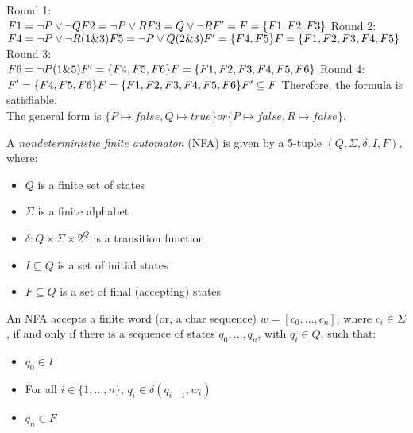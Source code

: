 \documentclass[11pt,a4paper]{article}
\begin{document}
	\begin{solution}
		Round 1:\\
		$F1 = \lnot P \lor \lnot Q \\
		F2 = \lnot P \lor R \\
		F3 = Q \lor \lnot R \\
		F' = \empty \\
		F = \{F1, F2, F3 \} \\
		$
		Round 2:\\
		$
		F4 = \lnot P \lor \lnot R (1\&3)\\
		F5 = \lnot P \lor Q (2\&3) \\
		F' = \{F4,F5\}\\
		F = \{F1,F2,F3,F4,F5\}\\
		$
		Round 3:\\
		$
		F6 = \lnot P (1\&5)\\
		F' = \{F4,F5,F6\}\\
		F = \{F1,F2,F3,F4,F5,F6\}\\
		$
		Round 4:\\
		$
		F' = \{F4,F5,F6\}\\
		F = \{F1,F2,F3,F4,F5,F6\}\\
		F' \subseteq F\\
		$
		Therefore, the formula is satisfiable.\\
		The general form is $\{P \mapsto false, Q \mapsto true\} or \{P \mapsto false, R \mapsto false\}.$
		\end{solution}
		
		\newpage
		
		A \emph{nondeterministic finite automaton} (NFA) is given by a 5-tuple $(Q, \Sigma, \delta, I, F)$, where:
		\begin{itemize}
		\item $Q$ is a finite set of states
		\item $\Sigma$ is a finite alphabet
		\item $\delta: Q \times \Sigma \times 2^Q$ is a transition function
		\item $I \subseteq Q$ is a set of initial states
		\item $F \subseteq Q$ is a set of final (accepting) states
		\end{itemize}
		
		An NFA accepts a finite word (or, a char sequence) $w = [c_0, \ldots, c_n]$, where $c_i \in \Sigma$,
		if and only if there is a sequence of states $q_0, \ldots, q_n$, with $q_i \in Q$, such that:
		\begin{itemize}
		\item $q_0 \in I$
		\item For all $i \in \{1, \ldots, n\}$, $q_i \in \delta(q_{i-1}, w_i)$
		\item $q_n \in F$
		\end{itemize}
		
\end{document}
